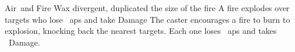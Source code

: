  {Air\ and Fire}%
  {Wax}%
  {divergent, duplicated}%
  {the size of the fire}%
  {A fire explodes over  targets who lose ~\glspl{ap} and take  Damage}%
  {
    The caster encourages a fire to burn to explosion, knocking back the nearest  targets.
    Each one loses ~\glspl{ap} and takes ~Damage.
  }
